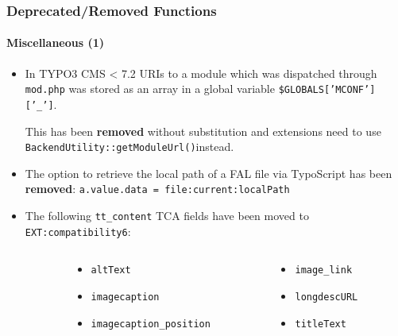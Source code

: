 \begin{frame}[fragile]
	\frametitle{Deprecated/Removed Functions}
	\framesubtitle{Miscellaneous (1)}

	\begin{itemize}

		\item In TYPO3 CMS < 7.2 URIs to a module which was dispatched through
			\texttt{mod.php} was stored as an array in a global variable
			\small\texttt{\$GLOBALS['MCONF']['\_']}\normalsize.

			This has been \textbf{removed} without substitution and extensions need to use
			\texttt{BackendUtility::getModuleUrl()}\normalsize\space instead.

		\item The option to retrieve the local path of a FAL file via TypoScript has
			been \textbf{removed}: \texttt{a.value.data = file:current:localPath}

		\item The following \texttt{tt\_content} TCA fields have been moved to
			\texttt{EXT:compatibility6}:

	\end{itemize}

	\vspace{-0.2cm}

	\begin{columns}[T]
		\begin{column}{.06\textwidth}
		\end{column}
		\begin{column}{.47\textwidth}
			\smaller
			\begin{itemize}
				\item \texttt{altText}
				\item \texttt{imagecaption}
				\item \texttt{imagecaption\_position}
			\end{itemize}
			\normalsize
		\end{column}
		\begin{column}{.47\textwidth}
			\smaller
			\begin{itemize}
				\item \texttt{image\_link}
				\item \texttt{longdescURL}
				\item \texttt{titleText}
			\end{itemize}
			\normalsize
		\end{column}
	\end{columns}

\end{frame}

